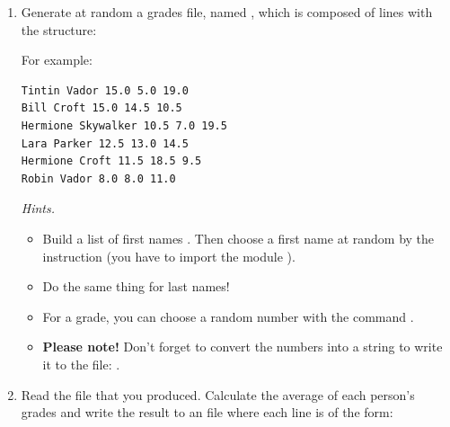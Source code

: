 \documentclass[11pt,class=report,crop=false]{standalone}
\begin{document}
\begin{activite}


\begin{enumerate}
  \item Generate at random a grades file, named , which is composed of lines with the structure: 
  
  For example:
\begin{center}
\begin{minipage}{0.5\textwidth}
\begin{lstlisting}
Tintin Vador 15.0 5.0 19.0
Bill Croft 15.0 14.5 10.5
Hermione Skywalker 10.5 7.0 19.5
Lara Parker 12.5 13.0 14.5
Hermione Croft 11.5 18.5 9.5
Robin Vador 8.0 8.0 11.0
\end{lstlisting}
\end{minipage}
\end{center}  
  

  \emph{Hints.}
  \begin{itemize}
    	\item Build a list of first names . Then choose a first name at random by the instruction  (you have to import the module ).
    	
    	\item Do the same thing for last names! 
    	
    	\item For a grade, you can choose a random number with the command . 
    	
    	\item \textbf{Please note!} Don't forget to convert the numbers into a string to write it to the file: .
    	
   \end{itemize}
    
  
  \item Read the  file that you produced. Calculate the average of each person's grades and write the result to an  file where each line is of the form:   
 

\end{enumerate}
\end{activite}
\end{document}

